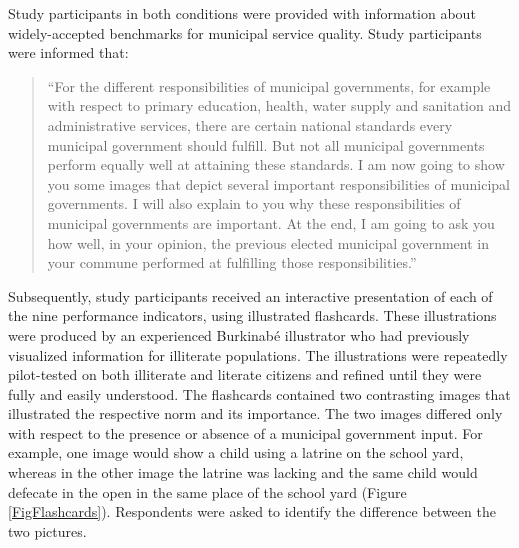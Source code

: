 \documentclass[11pt]{article}
\begin{document}
Study participants in both conditions were provided with information about widely-accepted benchmarks for municipal service quality. Study participants were informed that: 
\begin{quote}
``For the different responsibilities of municipal governments, for example with respect to primary education, health, water supply and sanitation and administrative services, there are certain national standards every municipal government should fulfill. But not all municipal governments perform equally well at attaining these standards. I am now going to show you some images that depict several important responsibilities of municipal governments. I will also explain to you why these responsibilities of municipal governments are important. At the end, I am going to ask you how well, in your opinion, the previous elected municipal government in your commune performed at fulfilling those responsibilities.''
\end{quote}
Subsequently, study participants received an interactive presentation of each of the nine performance indicators, using illustrated flashcards. These illustrations were produced by an experienced Burkinab\'{e} illustrator who had previously visualized information for illiterate populations. The illustrations were repeatedly pilot-tested on both illiterate and literate citizens and refined until they were fully and easily understood. The flashcards contained two contrasting images that illustrated the respective norm and its importance. 
The two images differed only with respect to the presence or absence of a municipal government input. For example, one image would show a child using a latrine on the school yard, whereas in the other image the latrine was lacking and the same child would defecate in the open in the same place of the school yard (Figure \ref{FigFlashcards}). Respondents were asked to identify the difference between the two pictures. 
\end{document}
